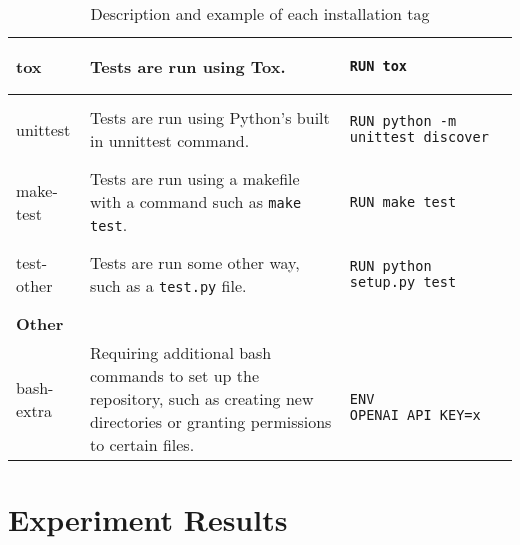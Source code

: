 \documentclass[conference]{IEEEtran}
\begin{document}
\begin{table}[!h]
\begin{tabular}{|lp{}l|}
\multicolumn{1}{|l|}{tox} & \multicolumn{1}{p{0.4\textwidth}|}{Tests are run using Tox.}
    & \begin{lstlisting}
RUN tox
    \end{lstlisting} \\ \hline
\multicolumn{1}{|l|}{unittest}           & \multicolumn{1}{p{0.4\textwidth}|}{Tests are run using Python's built in unnittest command.} 
    & \begin{lstlisting}
RUN python -m unittest discover
    \end{lstlisting} \\ \hline
\multicolumn{1}{|l|}{make-test}          & \multicolumn{1}{p{0.4\textwidth}|}{Tests are run using a makefile with a command such as \texttt{make test}.}
    & \begin{lstlisting}
RUN make test
    \end{lstlisting} \\ \hline
\multicolumn{1}{|l|}{test-other}         & \multicolumn{1}{p{0.4\textwidth}|}{Tests are run some other way, such as a \texttt{test.py} file.} 
    & \begin{lstlisting}
RUN python setup.py test
    \end{lstlisting}\\ \hline
\textbf{Other}                           &                                                                                                                                                                                                  &         \\ \hline
\multicolumn{1}{|l|}{bash-extra}         & \multicolumn{1}{p{0.4\textwidth}|}{Requiring additional bash commands to set up the repository, such as creating new directories or granting permissions to certain files.}
& \begin{lstlisting}

ENV OPENAI_API_KEY=x    
\end{lstlisting}\\ \hline
\end{tabular}
\caption{Description and example of each installation tag}
\end{table}

\clearpage
\section{Experiment Results}
\end{document}
